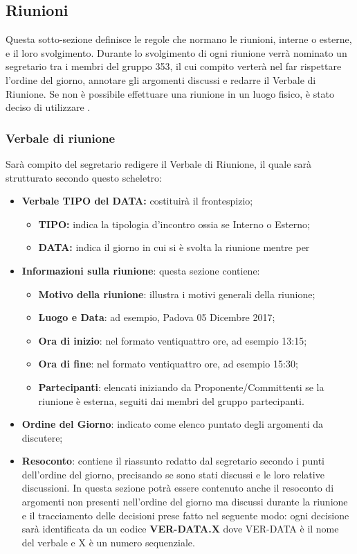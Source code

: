 \documentclass[NormeDiProgetto.tex]{subfiles}
\begin{document}
	\subsection{Riunioni}

	Questa sotto-sezione definisce le regole che normano le riunioni, interne o esterne, e il loro svolgimento. Durante lo svolgimento di ogni riunione verrà nominato un segretario tra i membri del gruppo 353, il cui compito verterà nel far rispettare l'ordine del giorno, annotare gli argomenti discussi e redarre il Verbale di Riunione.
	Se non è possibile effettuare una riunione in un luogo fisico, è stato deciso di utilizzare .

	\subsubsection{Verbale di riunione}
	Sarà compito del segretario redigere il Verbale di Riunione, il quale sarà strutturato secondo questo scheletro:
	\begin{itemize}
		\item \textbf{Verbale TIPO del DATA:} costituirà il frontespizio;
		\begin{itemize}
			\item \textbf{TIPO:} indica la tipologia d'incontro ossia se Interno o Esterno;
			\item \textbf{DATA:} indica il giorno in cui si è svolta la riunione mentre per 
		\end{itemize}
		\item \textbf{Informazioni sulla riunione}: questa sezione contiene:
		\begin{itemize}
			\item \textbf{Motivo della riunione}: illustra i motivi generali della riunione; 
			\item \textbf{Luogo e Data}: ad esempio, Padova 05 Dicembre 2017;
			\item \textbf{Ora di inizio}: nel formato ventiquattro ore, ad esempio 13:15;
			\item \textbf{Ora di fine}: nel formato ventiquattro ore, ad esempio 15:30;
			\item \textbf{Partecipanti}: elencati iniziando da Proponente/Committenti se la riunione è esterna, seguiti dai membri del gruppo partecipanti.			\end{itemize}
			\item \textbf{Ordine del Giorno}: indicato come elenco puntato degli argomenti da discutere;
			\item \textbf{Resoconto}: contiene il riassunto redatto dal segretario secondo i punti dell'ordine del giorno, precisando se sono stati discussi e le loro relative discussioni. In questa sezione potrà essere contenuto anche il resoconto di argomenti non presenti nell'ordine del giorno ma discussi durante la riunione e il tracciamento delle decisioni prese fatto nel seguente modo: ogni decisione sarà identificata da un codice \textbf{VER-DATA.X} dove VER-DATA è il nome del verbale e X è un numero sequenziale.
	\end{itemize}
\end{document}
